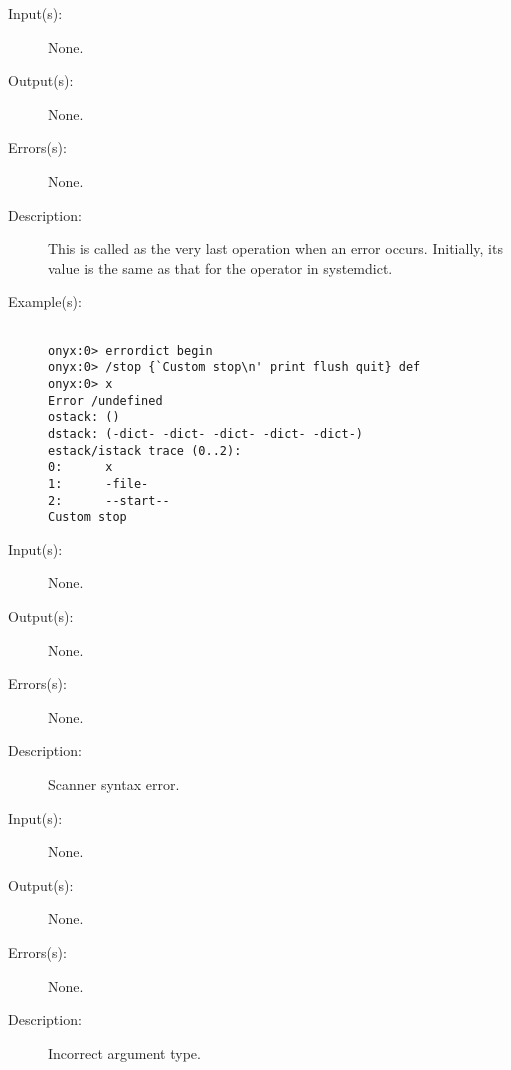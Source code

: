 \begin{description}
\label{errordict:stop}
\item[{\onyxop{--}{stop}{--}}: ]
	\begin{description}\item[]
	\item[Input(s): ] None.
	\item[Output(s): ] None.
	\item[Errors(s): ] None.
	\item[Description: ]
		This is called as the very last operation when an error occurs.
		Initially, its value is the same as that for the
		 operator in
		systemdict.
	\item[Example(s): ]\begin{verbatim}

onyx:0> errordict begin
onyx:0> /stop {`Custom stop\n' print flush quit} def
onyx:0> x
Error /undefined
ostack: ()
dstack: (-dict- -dict- -dict- -dict- -dict-)
estack/istack trace (0..2):
0:      x
1:      -file-
2:      --start--
Custom stop
		\end{verbatim}
	\end{description}
\label{syntaxerror}
\label{errordict:syntaxerror}
\item[{\onyxop{--}{syntaxerror}{--}}: ]
	\begin{description}\item[]
	\item[Input(s): ] None.
	\item[Output(s): ] None.
	\item[Errors(s): ] None.
	\item[Description: ]
		Scanner syntax error.
	\end{description}
\label{typecheck}
\label{errordict:typecheck}
\item[{\onyxop{--}{typecheck}{--}}: ]
	\begin{description}\item[]
	\item[Input(s): ] None.
	\item[Output(s): ] None.
	\item[Errors(s): ] None.
	\item[Description: ]
		Incorrect argument type.
	\end{description}
\label{undefined}
\label{errordict:undefined}
\item[{\onyxop{--}{undefined}{--}}: ]

\end{description}
